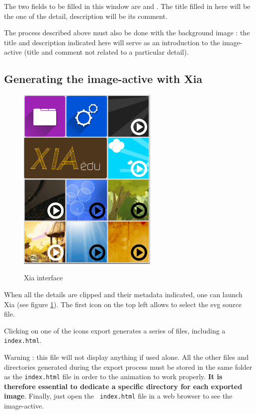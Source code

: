 The two fields to be filled in this window are  and 
.  The title filled in here will be the one of the detail, 
description will be its comment.

The process described above must also be done with the background image : 
the title and description indicated here will serve as an introduction to 
the image-active (title and comment not related to a particular detail).

\subsection{Generating the image-active with Xia}

\begin{figure}[htp]
 \centering
 \caption{Xia interface}
 \includegraphics[width=0.6\textwidth]{./images/xia_vue_generale}
 \label{xia_interface}
\end{figure}

When all the details are clipped and their metadata indicated, one can launch 
Xia (see figure  
\ref{xia_interface}). The first icon on the top left allows 
to select the svg source file.


Clicking on one of the icons export generates a series of files, including a 
\verb|index.html|. 

\begin{alerte}
Warning : this file will not display anything if used 
alone. All the other files and directories generated during the export process 
must be stored in  the same folder as the \verb|index.html| file in order to 
the animation to work properly. \textbf{It is therefore essential to 
dedicate a specific directory for each exported image}. Finally, just open 
the \verb| index.html| file in a web browser to see the image-active.
\end{alerte}

